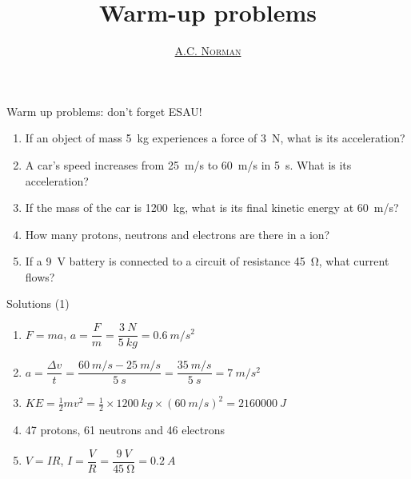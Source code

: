 \documentclass[14pt]{beamer}
\title[Revision]{Warm-up problems}
\author{\href{http://andrewcnorman.net/}{\textsc{A.C. Norman}}}
\date{}
\begin{document}

\begin{frame}{}
\titlepage
\vspace*{2em}
\ccbyncsa
\end{frame}

%
%
%

\begin{frame}{Warm up problems: don't forget ESAU!}
\begin{enumerate}
\item\label{2.3} If an object of mass \SI{5}{kg} experiences a force of \SI{3}{N}, what is its acceleration?
\item\label{3.1} A car's speed increases from \SI{25}{m/s} to \SI{60}{m/s} in \SI{5}{s}.  What is its acceleration?
\item\label{6.1} If the mass of the car is \SI{1200}{kg}, what is its final kinetic energy at \SI{60}{m/s}?
\item\label{19} How many protons, neutrons and electrons are there in a  ion?
\item\label{11.2} If a \SI{9}{V} battery is connected to a circuit of resistance \SI{45}{\ohm}, what current flows?
\end{enumerate}
\end{frame}

\begin{frame}{Solutions (1)}
\begin{enumerate}
\item\label{2.3} $F=ma$, $a=\dfrac{F}{m}=\dfrac{\SI{3}{N}}{\SI{5}{kg}}=\SI{0.6}{m/s^{2}}$
\item\label{3.1} $a=\dfrac{\Delta v}{t}=\dfrac{\SI{60}{m/s}-\SI{25}{m/s}}{\SI{5}{s}}=\dfrac{\SI{35}{m/s}}{\SI{5}{s}}=\SI{7}{m/s^{2}}$
\item\label{6.1} $KE=\frac{1}{2}mv^2=\frac{1}{2}\times\SI{1200}{kg}\times(\SI{60}{m/s})^2=\SI{2160000}{J}$
\item\label{19} 47 protons, 61 neutrons and 46 electrons
\item\label{11.2} $V=IR$, $I=\dfrac{V}{R}=\dfrac{\SI{9}{V}}{\SI{45}{\ohm}}=\SI{0.2}{A}$
\end{enumerate}
\end{frame}
\end{document}
